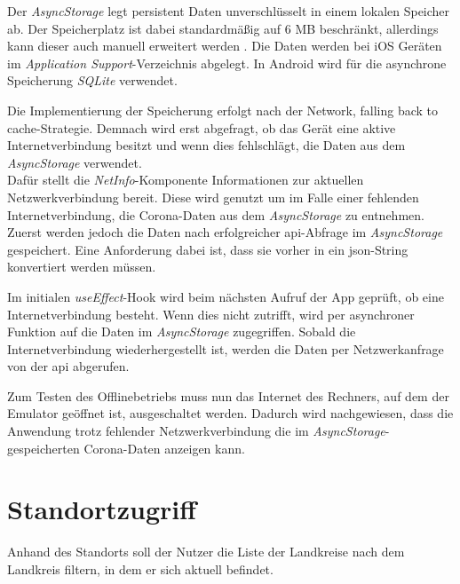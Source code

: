 Der \textit{AsyncStorage} legt persistent Daten unverschlüsselt in einem lokalen Speicher ab.
Der Speicherplatz ist dabei standardmäßig auf 6 MB beschränkt, allerdings kann dieser auch manuell erweitert werden \cite{Behrends.2018}.
Die Daten werden bei iOS Geräten im \textit{Application Support}-Verzeichnis abgelegt.
In Android wird für die asynchrone Speicherung \textit{SQLite} verwendet.

Die Implementierung der Speicherung erfolgt nach der \glqq Network, falling back to cache\grqq{}-Strategie.
Demnach wird erst abgefragt, ob das Gerät eine aktive Internetverbindung besitzt und wenn dies fehlschlägt, die Daten aus dem \textit{AsyncStorage} verwendet.\\
Dafür stellt die \textit{NetInfo}-Komponente Informationen zur aktuellen Netzwerkverbindung bereit.
Diese wird genutzt um im Falle einer fehlenden Internetverbindung, die Corona-Daten aus dem \textit{AsyncStorage} zu entnehmen.\\
Zuerst werden jedoch die Daten nach erfolgreicher \ac{api}-Abfrage im \textit{AsyncStorage} gespeichert.
Eine Anforderung dabei ist, dass sie vorher in ein \ac{json}-String konvertiert werden müssen.

Im initialen \textit{useEffect}-Hook wird beim nächsten Aufruf der App geprüft, ob eine Internetverbindung besteht.
Wenn dies nicht zutrifft, wird per asynchroner Funktion auf die Daten im \textit{AsyncStorage} zugegriffen.
Sobald die Internetverbindung wiederhergestellt ist, werden die Daten per Netzwerkanfrage von der \ac{api} abgerufen.

Zum Testen des Offlinebetriebs muss nun das Internet des Rechners, auf dem der Emulator geöffnet ist, ausgeschaltet werden.
Dadurch wird nachgewiesen, dass die Anwendung trotz fehlender Netzwerkverbindung die im \textit{AsyncStorage}-gespeicherten Corona-Daten anzeigen kann.

\section{Standortzugriff}

Anhand des Standorts soll der Nutzer die Liste der Landkreise nach dem Landkreis filtern, in dem er sich aktuell befindet.

